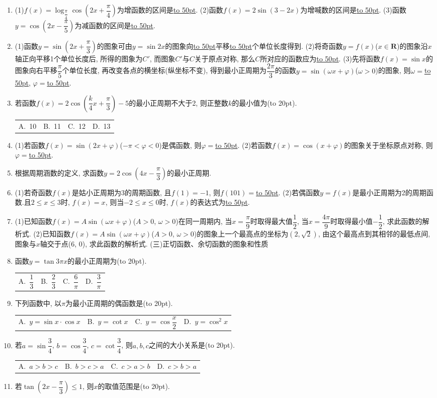 \documentclass[10pt,a4paper]{article}
\newcommand{\blank}[1]{\underline{\hbox to #1pt{}}}
\newcommand{\bracket}[1]{(\hbox to #1pt{})}
\newcommand{\fourch}[4]{\par\begin{tabular}{p{.23\textwidth}p{.23\textwidth}p{.23\textwidth}p{.23\textwidth}}
A.~#1 &B.~#2& C.~#3& D.~#4
\end{tabular}}
\begin{document}
\begin{enumerate}[1.]
\item (1)$f(x)=\log _{\dfrac{\pi }4}\cos (2x+\dfrac{\pi }4)$为增函数的区间是\blank{50}.
(2)函数$f(x)=2\sin (3-2x)$为增喊数的区间是\blank{50}.
(3)函数$y=\cos (2x-\dfrac{\pi }5)$为减函数的区间是\blank{50}.
\item (1)函数$y=\sin (2x+\dfrac{\pi }3)$的图象可由$y=\sin 2x$的图象向\blank{50}平移\blank{50}个单位长度得到.
(2)将奇函数$y=f(x)$($x\in \mathbf{R}$)的图象沿$x$轴正向平移1个单位长度后, 所得的图象为$C'$, 而图象$C'$与$C$关于原点对称, 那么$C$所对应的函数应为\blank{50}.
(3)先将函数$f(x)=\sin x$的图象向右平移$\dfrac{\pi }5$个单位长度, 再改变各点的横坐标(纵坐标不变), 得到最小正周期为$\dfrac{2\pi }3$的函数$y=\sin (\omega x+\varphi)$($\omega >0$)的图象, 则$\omega =$\blank{50}, $\varphi =$\blank{50}.
\item 若函数$f(x)=2\cos (\dfrac k4x+\dfrac{\pi }3)-5$的最小正周期不大于2, 则正整数$k$的最小值为\bracket{20}.
\fourch{10}{11}{12}{13}
\item (1)若函数$f(x)=\sin (2x+\varphi)$($-\pi <\varphi <0$)是偶函数, 则$\varphi =$\blank{50}.
(2)若函数$f(x)=\cos (x+\varphi)$的图象关于坐标原点对称, 则$\varphi =$\blank{50}.
\item 根据周期涵数的定义, 求函数$y=2\cos (4x-\dfrac{\pi }3)$的最小正周期.
\item (1)若奇函数$f(x)$是姑小正周期为3的周期函数, 且$f(1)=-1$, 则$f(101)=$\blank{50}.
(2)若偶函数$y=f(x)$是最小正周期为2的周期函数.且$2\le x\le 3$时, $f(x)=x$, 则当$-2\le x\le 0$时, $f(x)$的表达式为\blank{50}.
\item (1)已知函数$f(x)=A\sin (\omega x+\varphi)$($A>0$, $\omega >0$)在同一周期内, 当$x=\dfrac{\pi }9$时取得最大值$\dfrac 12$, 当$x=\dfrac{4\pi }9$时取得最小值$-\dfrac 12$, 求此函数的解析式.
(2)已知函数$f(x)=A\sin (\omega x+\varphi)$($A>0$, $\omega >0$)的图象上一个最高点的坐标为$(2,\sqrt 2)$, 由这个最高点到其相邻的最低点间, 图象与$x$轴交于点(6, 0), 求此函数的解析式.
(三)正切函数、余切函数的图象和性质
\item 函数$y=\tan 3\pi x$的最小正周期为\bracket{20}.
\fourch{$\dfrac 13$}{$\dfrac 23$}{$\dfrac 6{\pi }$}{$\dfrac 3{\pi }$}
\item 下列函数中, 以$\pi$为最小正周期的偶函数是\bracket{20}.
\fourch{$y=\sin x\cdot \cos x$}{$y=\cot x$}{$y=\cos \dfrac x2$}{$y=\cos ^2x$}
\item 若$a=\sin \dfrac 34$, $b=\cos \dfrac 34$, $c=\cot \dfrac 34$, 则$a,b,c$之间的大小关系是\bracket{20}.
\fourch{$a>b>c$}{$b>c>a$}{$c>a>b$}{$c>b>a$}
\item 若$\tan (2x-\dfrac{\pi }3)\le 1$, 则$x$的取值范围是\bracket{20}.

\end{enumerate}
\end{document}
